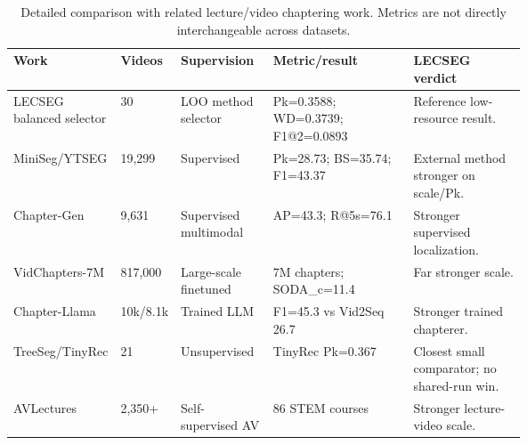 \begin{table}[t]
\centering
\scriptsize
\setlength{\tabcolsep}{3pt}
\renewcommand{\arraystretch}{1.08}
\caption{Detailed comparison with related lecture/video chaptering work. Metrics are not directly interchangeable across datasets.}
\label{tab:related_work_detailed}
\begin{tabularx}{\linewidth}{p{0.17\linewidth}p{0.10\linewidth}p{0.18\linewidth}X p{0.22\linewidth}}
\toprule
Work & Videos & Supervision & Metric/result & LECSEG verdict \\
\midrule
LECSEG balanced selector & 30 & LOO method selector & Pk=0.3588; WD=0.3739; F1@2=0.0893 & Reference low-resource result. \\
MiniSeg/YTSEG & 19,299 & Supervised & Pk=28.73; BS=35.74; F1=43.37 & External method stronger on scale/Pk. \\
Chapter-Gen & 9,631 & Supervised multimodal & AP=43.3; R@5s=76.1 & Stronger supervised localization. \\
VidChapters-7M & 817,000 & Large-scale finetuned & 7M chapters; SODA\_c=11.4 & Far stronger scale. \\
Chapter-Llama & 10k/8.1k & Trained LLM & F1=45.3 vs Vid2Seq 26.7 & Stronger trained chapterer. \\
TreeSeg/TinyRec & 21 & Unsupervised & TinyRec Pk=0.367 & Closest small comparator; no shared-run win. \\
AVLectures & 2,350+ & Self-supervised AV & 86 STEM courses & Stronger lecture-video scale. \\
\bottomrule
\end{tabularx}
\end{table}